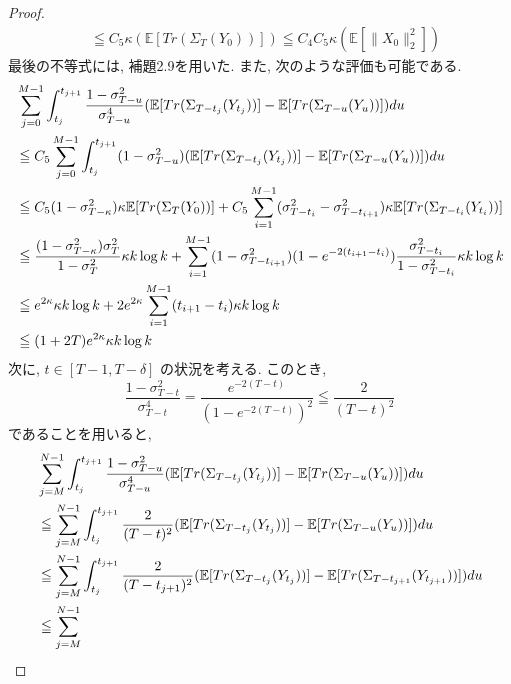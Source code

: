 \documentclass[11pt,a4paper]{ltjsarticle}
\theoremstyle{remark}
\begin{document}
\begin{proof}
\begin{align}
        &\leqq C_5\kappa(\mathbb{E}[Tr(\Sigma_{T}(Y_{0}))])\leqq C_4C_5\kappa(\mathbb{E}[\|X_0\|^2_2])
    \end{align}
    最後の不等式には, 補題2.9を用いた.
    また, 次のような評価も可能である.
    \begin{align}
        &\sum_{j=0}^{M-1}\int_{t_j}^{t_{j+1}}
        \frac{1-\sigma^2_{T-u}}{\sigma^4_{T-u}}
        (\mathbb{E}[Tr(\Sigma_{T-t_j}(Y_{t_j}))]-\mathbb{E}[Tr(\Sigma_{T-u}(Y_u))])
        du \notag\\
        &\leqq C_5\sum_{j=0}^{M-1}\int_{t_j}^{t_{j+1}}
        (1-\sigma^2_{T-u})
        (\mathbb{E}[Tr(\Sigma_{T-t_j}(Y_{t_j}))]-\mathbb{E}[Tr(\Sigma_{T-u}(Y_u))])
        du \notag\\
        &\leqq C_5(1-\sigma^2_{T-\kappa})\kappa\mathbb{E}[Tr(\Sigma_T(Y_0))]+C_5\sum_{i=1}^{M-1}(\sigma^2_{T-t_i}-\sigma^2_{T-t_{i+1}})\kappa\mathbb{E}[Tr(\Sigma_{T-t_i}(Y_{t_i}))]\notag\\
        &\leqq \frac{(1-\sigma^2_{T-\kappa})\sigma^2_T}{1-\sigma^2_T}\kappa k\log{k}+\sum_{i=1}^{M-1}(1-\sigma^2_{T-t_{i+1}})(1-e^{-2(t_{i+1}-t_i)})\frac{\sigma^2_{T-t_i}}{1-\sigma^2_{T-t_i}}\kappa k\log{k}\notag\\
        &\leqq e^{2\kappa}\kappa k\log{k}+2e^{2\kappa}\sum_{i=1}^{M-1}(t_{i+1}-t_i)\kappa k\log{k}\notag\\
        &\leqq (1+2T)e^{2\kappa}\kappa k\log{k}
    \end{align}
    次に, $t\in [T-1,T-\delta]$ の状況を考える. このとき, 
    \begin{equation}
        \frac{1-\sigma^2_{T-t}}{\sigma^4_{T-t}}=\frac{e^{-2(T-t)}}{(1-e^{-2(T-t)})^2}\leqq \frac{2}{(T-t)^2}
    \end{equation}
    であることを用いると, 
    \begin{align}
        &\sum_{j=M}^{N-1}\int_{t_j}^{t_{j+1}}
        \frac{1-\sigma^2_{T-u}}{\sigma^4_{T-u}}
        (\mathbb{E}[Tr(\Sigma_{T-t_j}(Y_{t_j}))]-\mathbb{E}[Tr(\Sigma_{T-u}(Y_u))])
        du \notag\\
        &\leqq\sum_{j=M}^{N-1}\int_{t_j}^{t_{j+1}}
        \frac{2}{(T-t)^2}
        (\mathbb{E}[Tr(\Sigma_{T-t_j}(Y_{t_j}))]-\mathbb{E}[Tr(\Sigma_{T-u}(Y_u))])
        du \notag\\
        &\leqq\sum_{j=M}^{N-1}\int_{t_j}^{t_{j+1}}
        \frac{2}{(T-{t_{j+1}})^2}
        (\mathbb{E}[Tr(\Sigma_{T-t_j}(Y_{t_j}))]-\mathbb{E}[Tr(\Sigma_{T-{t_{j+1}}}(Y_{t_{j+1}}))])
        du \notag\\
        &\leqq\sum_{j=M}^{N-1}

\end{align}
\end{proof}
\end{document}
